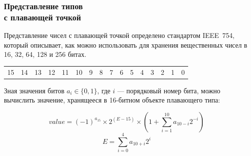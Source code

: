 \documentclass[compress, 8pt, aspectratio=169]{beamer}
\newenvironment{sixteenbit}{%
    \begin{center}
        \begin{tabular}{ |m{0.2cm}|m{0.2cm}|m{0.2cm}|m{0.2cm}|m{0.2cm}|m{0.2cm}|m{0.2cm}|m{0.2cm}|m{0.2cm}|m{0.2cm}|m{0.2cm}|m{0.2cm}|m{0.2cm}|m{0.2cm}|m{0.2cm}|m{0.2cm}|  }
            \hline
}{
        \hline
        \multicolumn{1}{c}{\color{gray}\tiny{15}} &
        \multicolumn{1}{c}{\color{gray}\tiny{14}} &
        \multicolumn{1}{c}{\color{gray}\tiny{13}} &
        \multicolumn{1}{c}{\color{gray}\tiny{12}} &
        \multicolumn{1}{c}{\color{gray}\tiny{11}} &
        \multicolumn{1}{c}{\color{gray}\tiny{10}} &
        \multicolumn{1}{c}{\color{gray}\tiny{9}} &
        \multicolumn{1}{c}{\color{gray}\tiny{8}} &
        \multicolumn{1}{c}{\color{gray}\tiny{7}} &
        \multicolumn{1}{c}{\color{gray}\tiny{6}} &
        \multicolumn{1}{c}{\color{gray}\tiny{5}} &
        \multicolumn{1}{c}{\color{gray}\tiny{4}} &
        \multicolumn{1}{c}{\color{gray}\tiny{3}} &
        \multicolumn{1}{c}{\color{gray}\tiny{2}} &
        \multicolumn{1}{c}{\color{gray}\tiny{1}} &
        \multicolumn{1}{c}{\color{gray}\tiny{0}} \\
        \end{tabular}
    \end{center}
}
\begin{document}
\begin{frame}[fragile]

    \frametitle{Представление типов \\ с плавающей точкой}

    Представление чисел с плавающей точкой определено стандартом
    IEEE~754, который описывает, как можно использовать для хранения
    вещественных чисел в 16, 32, 64, 128 и 256 битах.

    \hfill\break

    \begin{sixteenbit}
        \cellcolor{blue!40!white}{} &
        \cellcolor{green!40!white}{} &
        \cellcolor{green!40!white}{} &
        \cellcolor{green!40!white}{} &
        \cellcolor{green!40!white}{} &
        \cellcolor{green!40!white}{} &
        \cellcolor{red!40!white}{} &
        \cellcolor{red!40!white}{} &
        \cellcolor{red!40!white}{} &
        \cellcolor{red!40!white}{} &
        \cellcolor{red!40!white}{} &
        \cellcolor{red!40!white}{} &
        \cellcolor{red!40!white}{} &
        \cellcolor{red!40!white}{} &
        \cellcolor{red!40!white}{} &
        \cellcolor{red!40!white}{} \\
    \end{sixteenbit}

    Зная значения битов $a_i \in \{0,1\}$, где $i$ ---
    порядковый номер бита, можно вычислить значение, хранящееся
    в 16-битном объекте плавающего типа:

    \begin{displaymath}
        value = (-1)^{a_{15}} \times 2^{(E-15)}
            \times (1 + \sum_{i=1}^{10} a_{10-i} 2^{-i})
    \end{displaymath}
    \begin{displaymath}
        E = \sum_{i=0}^{4} a_{10+i} 2^i
    \end{displaymath}

\end{frame}
\end{document}
